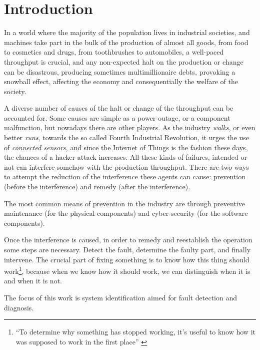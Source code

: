 
\chapter{Introduction}
In a world where the majority of the population lives in industrial societies,
and machines take part in the bulk of the production of almost all goods, from
food to cosmetics and drugs, from toothbrushes to automobiles, 
a well-paced throughput is crucial, and any non-expected halt on the
production or change can be disastrous, producing sometimes multimillionaire debts,
provoking a snowball effect, affecting the economy and consequentially the welfare of the society.

A diverse number of causes of the halt or change of the throughput can be
accounted for. Some causes are simple as a power outage, or a component malfunction,
but nowadays there are other players. As the industry \textsl{walks}, or even
better \textsl{runs}, towards the so called Fourth Industrial Revolution, 
it urges the use of \textit{connected sensors}, and since the Internet of
Things is the fashion these days, the chances of a hacker attack increases. All
these kinds of failures, intended or not can interfere somehow with the
production throughput. There are two ways to attempt the reduction of the interference these agents can
cause: prevention (before the interference) and remedy (after the interference).

The most common means of prevention in the industry are through preventive
maintenance (for the physical components) and cyber-security (for the software
components).

Once the interference is caused, in order to remedy and reestablish
the operation some steps are necessary. Detect the fault, determine the faulty
part, and finally intervene.
The crucial part of fixing something is to know how this thing should
work\footnote{``To determine why something has stopped working, it's useful to
  know how it was supposed to work in the first place'' \cite{davis1988model}},
because when we know how it should work, we can distinguish when it is and when
it is not.

The focus of this work is system identification aimed for fault
detection and diagnosis.



